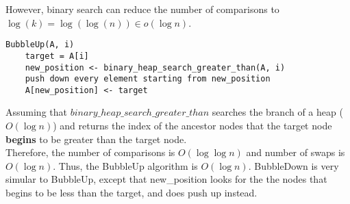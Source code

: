 \documentclass[12pt]{article}
\begin{document}
However, binary search can reduce the number of comparisons to $\log(k) = \log(\log(n)) \in o(\log n)$. 

\begin{lstlisting}
BubbleUp(A, i)
	target = A[i]
	new_position <- binary_heap_search_greater_than(A, i)
	push down every element starting from new_position
	A[new_position] <- target
\end{lstlisting}

Assuming that $binary\_heap\_search\_greater\_than$ searches the branch of a heap ($O(\log n)$) and returns the index of the ancestor nodes that the target node {\bf begins} to be greater than the target node.\\

Therefore, the number of comparisons is $O(\log\log n)$ and number of swaps is $O(\log n)$. Thus, the BubbleUp algorithm is $O(\log n)$. BubbleDown is very simular to BubbleUp, except that new\_position looks for the the nodes that begins to be less than the target, and does push up instead.
\end{document}
